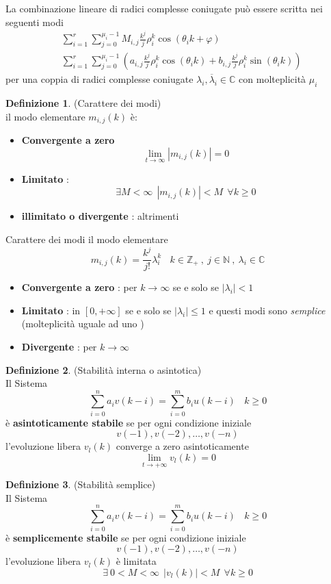 \documentclass{article}
\theoremstyle{definition}
\newtheorem*{definizione}{Definizione}
\newcommand{\C}{\mathbb{C}}
\newcommand{\la}{\lambda}
\newcommand{\sisdiscro}{\sum_{i=0}^n a_iv(k-i)=\sum_{i=0}^m b_iu(k-i) \ \ \ \ k \geq 0}
\begin{document}
	La combinazione lineare di radici complesse coniugate può essere scritta nei seguenti modi 
	\begin{align*}
		&\sum_{i=1}^{r}\sum_{j=0}^{\mu_i-1}M_{i,j} \frac{k^j}{j}\rho_i^k \cos (\theta_ik+\varphi) \\
		&\sum_{i=1}^{r}\sum_{j=0}^{\mu_i-1} \left(a_{i,j} \frac{k^j}{j}\rho_i^k \cos(\theta_i k) + b_{i,j}\frac{k^j}{j} \rho_i^k \sin(\theta_ik)\right) 
	\end{align*}
	per una coppia di radici complesse coniugate $\la_i,\overline{\la}_i \in \C $ con molteplicità $\mu_i$
	\begin{definizione}(Carattere dei modi)\\
		il modo elementare $m_{i,j}(k)$ è: 
		\begin{itemize}
			\item \textbf{Convergente a zero} 
			$$\lim_{t \rightarrow \infty} |m_{i,j}(k)|=0$$
			\item  \textbf{Limitato} :
			$$\exists M < \infty \ \  | m_{i,j}(k)|<M \ \ \forall k \geq 0$$
			\item \textbf{illimitato o divergente } : altrimenti  
		\end{itemize}
	\end{definizione}
	\begin{teo}{Carattere dei modi}{}
		il modo elementare 
		$$m_{i,j}(k)=\frac{k^j}{j!}\la_i^k \ \ \ \ k \in \mathbb{Z}_+ \ , \ j \in \mathbb{N} \ , \ \la_i \in \C$$
		\begin{itemize}
			\item \textbf{Convergente a zero } : per $k \rightarrow \infty$ se e solo se $|\la_i|<1$ 
			\item \textbf{Limitato} : in $[0,+\infty]$ se e solo se $|\la_i|\leq 1 $ e questi modi sono \textit{semplice} (molteplicità uguale ad uno )
			\item \textbf{Divergente} : per $k \rightarrow \infty $
 		\end{itemize}
	\end{teo}
	\newpage
		\begin{definizione}(Stabilità interna o asintotica)\\
		Il Sistema $$\sisdiscro$$ è \textbf{asintoticamente stabile } se per ogni condizione iniziale 
		$$v(-1),v(-2),\dots , v(-n)$$ l'evoluzione libera $v_l(k)$ converge a zero asintoticamente 
		$$\lim_{t \rightarrow +\infty }v_l(k)=0$$
	\end{definizione}
	\begin{definizione}(Stabilità semplice) \\
		Il Sistema $$\sisdiscro	$$ è \textbf{semplicemente  stabile } se per ogni condizione iniziale 	$$v(-1),v(-2),\dots , v(-n)$$ l'evoluzione libera $v_l(k)$ è limitata 
		$$\exists \ 0<M < \infty \ \  |v_l(k)|<M \ \ \forall k \geq 0$$
	\end{definizione}
\end{document}
